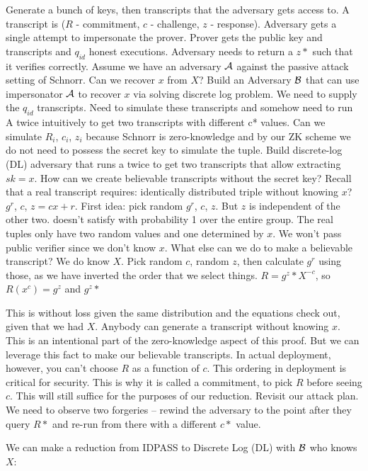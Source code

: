 Generate a bunch of keys, then transcripts that the adversary gets access to. A transcript is ($R$ - commitment, $c$ - challenge, $z$ - response). Adversary gets a single attempt to impersonate the prover. Prover gets the public key and transcripts and $q_{id}$ honest executions. Adversary needs to return a $z*$ such that it verifies correctly. Assume we have an adversary ${\mathcal A}$ against the passive attack setting of Schnorr. Can we recover $x$ from $X$? Build an Adversary ${\mathcal B}$ that can use impersonator ${\mathcal A}$ to recover $x$ via solving discrete log problem. We need to supply the $q_{id}$ transcripts. Need to simulate these transcripts and somehow need to run A twice intuitively to get two transcripts with different c* values. Can we simulate $R_i$, $c_i$, $z_i$ because Schnorr is zero-knowledge and by our ZK scheme we do not need to possess the secret key to simulate the tuple. Build discrete-log (DL) adversary that runs a twice to get two transcripts that allow extracting $sk = x$.
How can we create believable transcripts without the secret key? 
Recall that a real transcript requires:
identically distributed triple without knowing $x$?
$g^r$, $c$, $z = cx + r$.
First idea: pick random $g^r$, $c$, $z$. But $z$ is independent of the other two. doesn't satisfy with probability 1 over the entire group. 
The real tuples only have two random values and one determined by $x$. We won't pass public verifier since we don't know $x$.
What else can we do to make a believable transcript? We do know $X$. Pick random $c$, random $z$, then calculate $g^r$ using those, as we have inverted the order that we select things.
$R = g^z * X^{-c}$, so $R(x^c) = g^z$ and $g^z * $

This is without loss given the same distribution and the equations check out, given that we had $X$. Anybody can generate a transcript without knowing $x$. This is an intentional part of the zero-knowledge aspect of this proof. But we can leverage this fact to make our believable transcripts. In actual deployment, however, you can't choose $R$ as a function of $c$. This ordering in deployment is critical for security. This is why it is called a commitment, to pick $R$ before seeing $c$. This will still suffice for the purposes of our reduction.
Revisit our attack plan. We need to observe two forgeries -- rewind the adversary to the point after they query $R*$ and re-run from there with a different $c*$ value.

We can make a reduction from IDPASS to Discrete Log (DL) with ${\mathcal B}$ who knows $X$:


